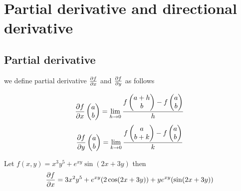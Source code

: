 \linespread{1.35}
\chapter{Partial derivative and directional derivative}
\setcounter{section}{-1}
\section{Partial derivative}

we define partial derivative $\pdv{f}{x}$ and $\pdv{f}{y}$ as follows
\begin{definition}
    $$\pdv{f}{x} \begin{pmatrix} a \\ b \end{pmatrix} = \lim\limits_{h \to 0} \frac{f\begin{pmatrix}a+h \\ b\end{pmatrix}- f \begin{pmatrix}a \\ b\end{pmatrix}}{h} $$
    $$\pdv{f}{y} \begin{pmatrix} a \\ b \end{pmatrix} = \lim\limits_{k \to 0} \frac{f\begin{pmatrix}a\\ b+k\end{pmatrix}- f \begin{pmatrix}a \\ b\end{pmatrix}}{k} $$

\end{definition}
\begin{eg}
    Let $f(x,y) = x^{3}y^{5} + e^{xy}\sin(2x+3y)$ then $$\pdv{f}{x} = 3x^{2}y^{5} + e^{xy}(2\cos(2x+3y)) + ye^{xy}(\sin(2x+3y))$$
\end{eg}

